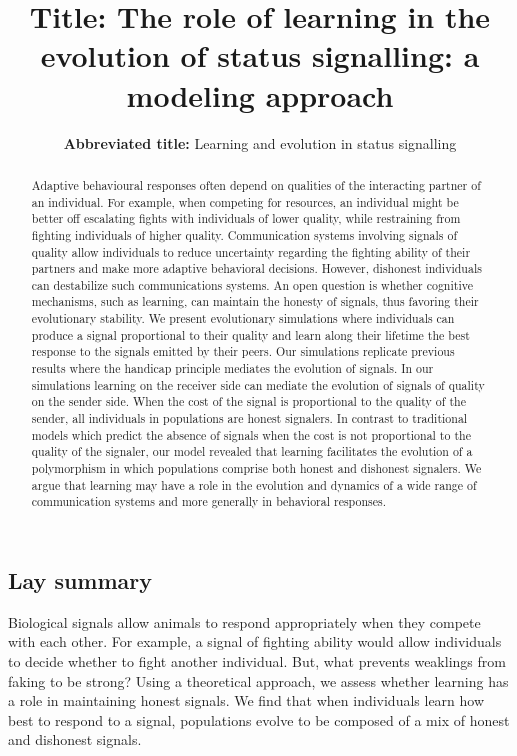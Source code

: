 \documentclass[
  12pt,
]{article}
\title{\large \textbf{Title:} The role of learning in the evolution of
status signalling: a modeling approach}
\subtitle{\normalsize \textbf{Abbreviated title:} Learning and evolution
in status signalling}
\date{}
\begin{document}
\maketitle
\begin{flushleft}
\end{flushleft}
\begin{abstract}
Adaptive behavioural responses often depend on qualities of the
interacting partner of an individual. For example, when competing for
resources, an individual might be better off escalating fights with
individuals of lower quality, while restraining from fighting
individuals of higher quality. Communication systems involving signals
of quality allow individuals to reduce uncertainty regarding the
fighting ability of their partners and make more adaptive behavioral
decisions. However, dishonest individuals can destabilize such
communications systems. An open question is whether cognitive
mechanisms, such as learning, can maintain the honesty of signals, thus
favoring their evolutionary stability. We present evolutionary
simulations where individuals can produce a signal proportional to their
quality and learn along their lifetime the best response to the signals
emitted by their peers. Our simulations replicate previous results where
the handicap principle mediates the evolution of signals. In our
simulations learning on the receiver side can mediate the evolution of
signals of quality on the sender side. When the cost of the signal is
proportional to the quality of the sender, all individuals in
populations are honest signalers. In contrast to traditional models
which predict the absence of signals when the cost is not proportional
to the quality of the signaler, our model revealed that learning
facilitates the evolution of a polymorphism in which populations
comprise both honest and dishonest signalers. We argue that learning may
have a role in the evolution and dynamics of a wide range of
communication systems and more generally in behavioral responses.
\end{abstract}
\subsection*{Lay summary}
Biological signals allow animals to respond appropriately when they
compete with each other. For example, a signal of fighting ability would
allow individuals to decide whether to fight another individual. But,
what prevents weaklings from faking to be strong? Using a theoretical
approach, we assess whether learning has a role in maintaining honest
signals. We find that when individuals learn how best to respond to a
signal, populations evolve to be composed of a mix of honest and
dishonest signals.
\end{document}
